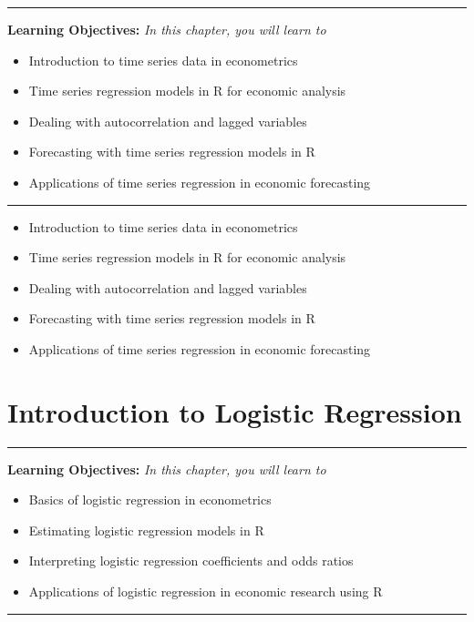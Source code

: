 \documentclass[
  letterpaper,
  twoside,
  openany]{scrbook}
\providecommand{\abstractname}{Learning Objectives} %
\newenvironment{objectives}[1]{%
	\hrule
	\vspace{5pt}
	\small\textbf{\abstractname: } 
	\newline
	\vspace{0.1cm}
	\small\emph{#1} %
	\itshape %
}{%
	\vspace{5pt}
	\hrule
	\vspace{0.6cm}
}
\begin{document}
\begin{objectives}{In this chapter, you will learn to}
\begin{itemize}

\item{Introduction to time series data in econometrics}

\item{Time series regression models in R for economic analysis}

\item{Dealing with autocorrelation and lagged variables}

\item{Forecasting with time series regression models in R}

\item{Applications of time series regression in economic forecasting}

\end{itemize}

\end{objectives}

\begin{itemize}
\item
  Introduction to time series data in econometrics
\item
  Time series regression models in R for economic analysis
\item
  Dealing with autocorrelation and lagged variables
\item
  Forecasting with time series regression models in R
\item
  Applications of time series regression in economic forecasting
\end{itemize}

\hypertarget{introduction-to-logistic-regression}{%
\chapter{Introduction to Logistic
Regression}\label{introduction-to-logistic-regression}}

\begin{objectives}{In this chapter, you will learn to}
\begin{itemize}

\item{Basics of logistic regression in econometrics}

\item{Estimating logistic regression models in R}

\item{Interpreting logistic regression coefficients and odds ratios}

\item{Applications of logistic regression in economic research using R}

\end{itemize}

\end{objectives}
\end{document}
